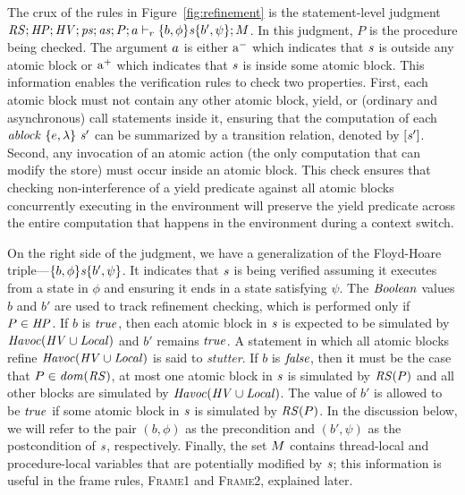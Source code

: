 
The crux of the rules in Figure~\ref{fig:refinement} is the statement-level judgment 
$\mathit{RS};\mathit{HP};\mathit{HV};\mathit{ps};\mathit{as};P;a \vdash_r \{b, \phi\} \mathit{s} \{b', \psi\};M$.
In this judgment, $P$ is the procedure being checked.
The argument $a$ is either
$\mathrm{a^-}$ which indicates that $\mathit{s}$ is outside any atomic block or
$\mathrm{a^+}$ which indicates that $\mathit{s}$ is inside some atomic block.
This information enables the verification rules to check two properties.
First, each atomic block must not contain any other atomic block, yield, or (ordinary and asynchronous) call statements inside it,
ensuring that the computation of each $\mathit{ablock}\ {\{e,\lambda\}}\ {\mathit{s}'}$ can be summarized by a transition relation, denoted by $[\mathit{s}']$.
Second, any invocation of an atomic action (the only computation that can modify the store) must occur inside an atomic block.
This check ensures that checking non-interference of a yield predicate against all atomic blocks concurrently executing 
in the environment will preserve the yield predicate across the entire computation that happens in the environment during a context switch.

On the right side of the judgment, we have a generalization of the Floyd-Hoare triple---$\{b,\phi\} \mathit{s} \{b',\psi\}$.
It indicates that $\mathit{s}$ is being verified assuming it executes from a state in $\phi$ and ensuring it ends in a state satisfying $\psi$.
The $\mathit{Boolean}$ values $b$ and $b'$ are used to track refinement checking, which is performed only if $P \in \mathit{HP}$.
If $b$ is $\mathit{true}$, then each atomic block in $\mathit{s}$ is expected to be simulated by $\mathit{Havoc}(\mathit{HV} \cup \mathit{Local})$ and $b'$ remains $\mathit{true}$.
A statement in which all atomic blocks refine $\mathit{Havoc}(\mathit{HV} \cup \mathit{Local})$ is said to {\em stutter}.
If $b$ is $\mathit{false}$, then it must be the case that $P \in \mathit{dom}(\mathit{RS})$, at most one atomic block in $\mathit{s}$ is simulated by $\mathit{RS}(P)$
and all other blocks are simulated by $\mathit{Havoc}(\mathit{HV} \cup \mathit{Local})$.
The value of $b'$ is allowed to be $\mathit{true}$ if some atomic block in $\mathit{s}$ is simulated by $\mathit{RS}(P)$.
In the discussion below, we will refer to the pair $(b,\phi)$ as the precondition and $(b',\psi)$
as the postcondition of $\mathit{s}$, respectively.
Finally, the set $M$ contains thread-local and procedure-local variables that are potentially modified by $\mathit{s}$;
this information is useful in the frame rules, \textsc{Frame1} and \textsc{Frame2}, explained later.

